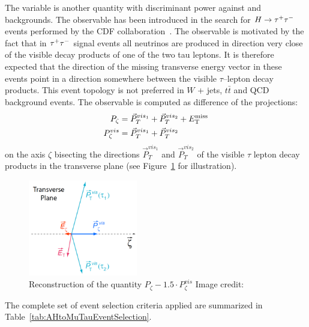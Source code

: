The \Pzeta variable is another quantity with discriminant power against \WpJets
and \ttbar backgrounds.  The observable has been introduced in the search for
$H\to\tau^+\tau^-$ events performed by the CDF collaboration~\cite{CDFrefPzeta}.  The
observable is motivated by the fact that in $\tau^+\tau^-$ signal events all neutrinos
are produced in direction very close of the visible decay products of one of the
two tau leptons. It is therefore expected that the direction of the missing
transverse energy vector in these events point in a direction somewhere between
the visible $\tau$--lepton decay products. This event topology is not preferred
in $W$ + jets, $t\bar{t}$ and QCD background events.  The observable is computed
as difference of the projections:
\begin{eqnarray}
P_{\zeta} &= \vec{P}_{T}^{vis_{1}} + \vec{P}_{T}^{vis_{2}} + E_{\mathrm{T}}^{\text{miss}} \nonumber \\
P_{\zeta}^{vis} &= \vec{P}_{T}^{vis_{1}} + \vec{P}_{T}^{vis_{2}} 
\label{eq:PZetaEq}
\end{eqnarray}
on the axis $\zeta$ bisecting the directions $\vec{P}_{T}^{vis_{1}}$ and
$\vec{P}_{T}^{vis_{2}}$ of the visible $\tau$ lepton decay products in the
transverse plane (see Figure~\ref{fig:PzetaDefinition} for illustration).
\begin{figure}[t]
\begin{center}
\includegraphics*[height=42mm]{selection_chapter/figures/evtReco_PzetaDefinition.pdf}
\caption[Reconstruction of \Pzeta variable]{Reconstruction of the quantity $P_{\zeta} - 1.5 \cdot
P_{\zeta}^{vis}$ Image credit:~\cite{CDFrefPzeta}} \label{fig:PzetaDefinition}
\end{center}
\end{figure} 
The complete set of event selection criteria applied are summarized in
Table~\ref{tab:AHtoMuTauEventSelection}.

